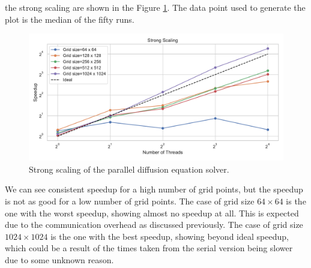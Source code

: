 \documentclass[unicode,11pt,a4paper,oneside,numbers=endperiod,openany]{scrartcl}
\begin{document}
the strong scaling are shown in the Figure \ref{fig:strong}. The data point used
to generate the plot is the median of the fifty runs.
\begin{figure}[h!]
    \centering
    \includegraphics[width=\textwidth]{../mini_app_mpi/strong_scaling_plot.pdf}
    \caption{Strong scaling of the parallel diffusion equation solver.}
    \label{fig:strong}
\end{figure}
We can see consistent speedup for a high number of grid points, but the speedup
is not as good for a low number of grid points. 
The case of grid size $64 \times 64$ is the one with the worst speedup, showing almost no speedup at all.
This is expected due to the communication overhead as discussed previously. 
The case of grid size $1024
\times 1024$ is the one with the best speedup, showing beyond ideal speedup,
which could be a result of the times taken from the serial version being slower
due to some unknown reason. 
\end{document}
